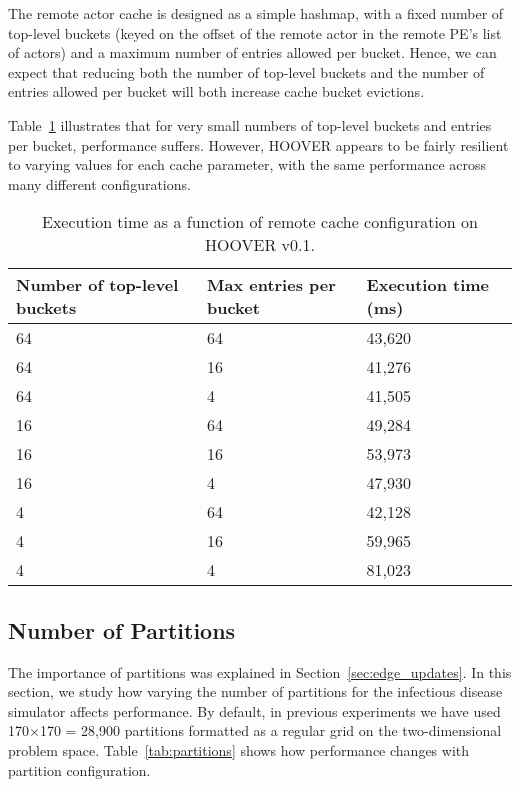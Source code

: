 The remote actor cache is designed as a simple hashmap, with a fixed number of
top-level buckets (keyed on the offset of the remote actor in the remote PE's
list of actors) and a maximum number of entries allowed per bucket. Hence, we
can expect that reducing both the number of top-level buckets and the number of
entries allowed per bucket will both increase cache bucket evictions.

Table~\ref{tab:cache} illustrates that for very small numbers of
top-level buckets and entries per bucket, performance suffers. However, HOOVER
appears to be fairly resilient to varying values for each cache parameter, with
the same performance across many different configurations.

\begin{table}
\centering
\begin{tabularx}{\textwidth}{ | X | X | X | }
\hline
Number of top-level buckets & Max entries per bucket & Execution time (ms) \\\hline
64                          & 64                     & 43,620 \\\hline
64                          & 16                     & 41,276 \\\hline
64                          & 4                      & 41,505 \\\hline
16                          & 64                     & 49,284 \\\hline
16                          & 16                     & 53,973 \\\hline
16                          & 4                      & 47,930 \\\hline
4                           & 64                     & 42,128 \\\hline
4                           & 16                     & 59,965 \\\hline
4                           & 4                      & 81,023 \\\hline
\end{tabularx}
\caption{Execution time as a function of remote cache configuration on HOOVER v0.1.}
\label{tab:cache}
\end{table}

\subsection{Number of Partitions}

The importance of partitions was explained in Section~\ref{sec:edge_updates}. In
this section, we study how varying the number of partitions for the infectious
disease simulator affects performance. By default, in previous experiments we
have used 170$\times$170 = 28,900 partitions formatted as a regular grid on the
two-dimensional problem space. Table~\ref{tab:partitions} shows how performance
changes with partition configuration.

